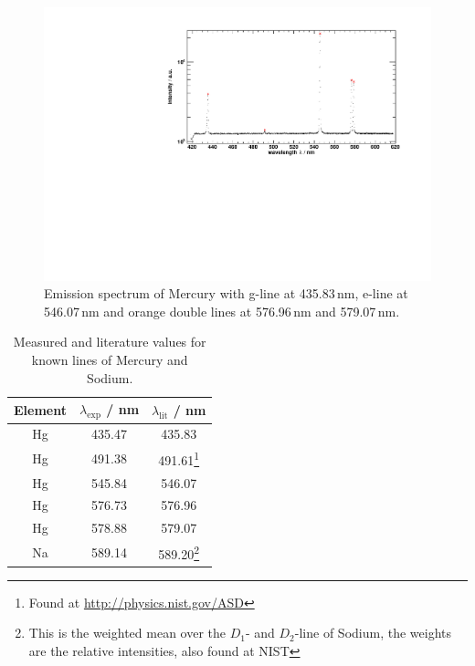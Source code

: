 \begin{figure}[H]
\begin{center}
  \includegraphics[width=\textwidth]{../img/HgPeaks.pdf}
  \caption[---]{Emission spectrum of Mercury with
  g-line at 435.83\,nm,
  e-line at 546.07\,nm and
  orange double lines at 576.96\,nm and 579.07\,nm.}
  \label{img:hg:spectrum}
\end{center}
\end{figure}

\begin{savenotes} %
\begin{table}[H]
\caption{Measured and literature values for known lines of Mercury and Sodium.}
\begin{center}
\begin{tabular}{|c|c|c|}
\hline
  Element & $\lambda_{\text{exp}}$ / nm & $\lambda_{\text{lit}}$ / nm \\ \hline
    Hg & 435.47 & 435.83 \\ \hline
    Hg & 491.38 & 491.61\footnote{Found at \url{http://physics.nist.gov/ASD}} \\ \hline
    Hg & 545.84 & 546.07 \\ \hline
    Hg & 576.73 & 576.96 \\ \hline
    Hg & 578.88 & 579.07 \\ \hline
    Na & 589.14 & 589.20\footnote{This is the weighted mean over the $D_1$- and $D_2$-line of Sodium, the weights are the relative intensities, also found at NIST} \\ \hline
\end{tabular}
\end{center}
\label{tab:energygauge}
\end{table}
\end{savenotes}

